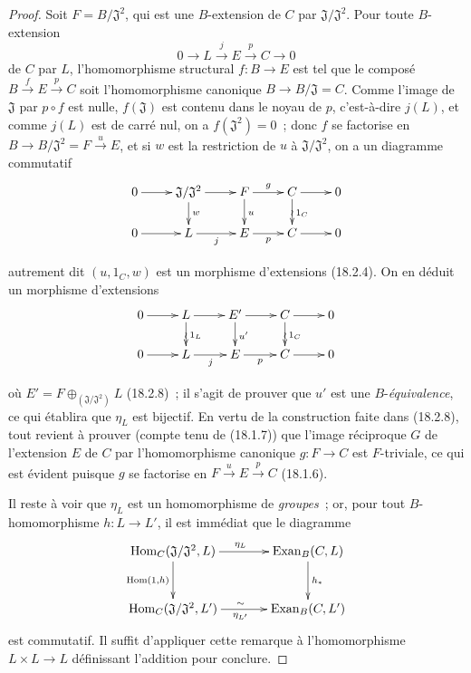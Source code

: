 \begin{proof}
Soit $F=B/\mathfrak J^2$, qui est une $B$-extension de $C$ par
$\mathfrak J/\mathfrak J^2$. Pour toute $B$-extension
\[
  0\longrightarrow L\xrightarrow{j}E\xrightarrow{p}C\longrightarrow0
\]
de $C$ par $L$, l'homomorphisme structural $f:B\to E$ est tel que le composé
$B\xrightarrow{f}E\xrightarrow{p}C$ soit l'homomorphisme canonique
$B\to B/\mathfrak J=C$. Comme l'image de $\mathfrak J$ par $p\circ f$ est
nulle, $f(\mathfrak J)$ est contenu dans le noyau de $p$, c'est-à-dire
$j(L)$, et comme $j(L)$ est de carré nul, on a $f(\mathfrak J^2)=0$~; donc
$f$ se factorise en
$B\to B/\mathfrak J^2=F\xrightarrow{u}E$, et si $w$ est la restriction de
$u$ à $\mathfrak J/\mathfrak J^2$, on a un diagramme commutatif
\[
  \xymatrix@C=2pc@R=1.5pc{
    0\ar[r] & \mathfrak J/\mathfrak J^2\ar[r]\ar[d]^w
      & F\ar[r]^g\ar[d]^u
      & C\ar[r]\ar[d]^{1_C}\ar@{}[d]|{\wr} & 0\\
    0\ar[r] & L\ar[r]_j & E\ar[r]_p & C\ar[r] & 0
  }
\]

autrement dit $(u,1_C,w)$ est un morphisme d'extensions (18.2.4). On en
déduit un morphisme d'extensions
\[
  \xymatrix@C=2pc@R=1.5pc{
    0\ar[r] & L\ar[r]\ar[d]^{1_L}\ar@{}[d]|{\wr}
      & E'\ar[r]\ar[d]^{u'}
      & C\ar[r]\ar[d]^{1_C}\ar@{}[d]|{\wr} & 0\\
    0\ar[r] & L\ar[r]_j & E\ar[r]_p & C\ar[r] & 0
  }
\]


où $E'=F\oplus_{(\mathfrak J/\mathfrak J^2)}L$ (18.2.8)~; il s'agit de
prouver que $u'$ est une $B$-\emph{équivalence}, ce qui établira que $\eta_L$
est bijectif. En vertu de la construction faite dans (18.2.8), tout revient à
prouver (compte tenu de (18.1.7)) que l'image réciproque $G$ de l'extension
$E$ de $C$ par l'homomorphisme canonique $g:F\to C$ est $F$-triviale, ce qui
est évident puisque $g$ se factorise en
$F\xrightarrow{u}E\xrightarrow{p}C$ (18.1.6).

Il reste à voir que $\eta_L$ est un homomorphisme de \emph{groupes}~; or, pour
tout $B$-homomorphisme $h:L\to L'$, il est immédiat que le diagramme
\[
  \xymatrix@C=3pc@R=2.4pc{
    \operatorname{Hom}_C(\mathfrak J/\mathfrak J^2,L)
      \ar[r]^{\eta_L}\ar[d]_{\operatorname{Hom}(1,h)}
      & \operatorname{Exan}_B(C,L)\ar[d]^{h_*}\\
    \operatorname{Hom}_C(\mathfrak J/\mathfrak J^2,L')
      \ar[r]_{\eta_{L'}}^{\sim}
      & \operatorname{Exan}_B(C,L')
  }
\]
est commutatif. Il suffit d'appliquer cette remarque à l'homomorphisme
$L\times L\to L$ définissant l'addition pour conclure.
\end{proof}

